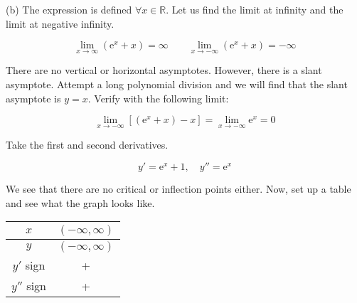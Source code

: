 \documentclass{article}
\begin{document}
\hfill

\noindent (b) The expression is defined $\forall x\in\mathbb{R}$. Let us find the limit at infinity and the limit at negative infinity.

\[\lim_{x\to\infty}\left(\mathrm{e}^x+x\right)=\infty\qquad\lim_{x\to-\infty}\left(\mathrm{e}^x+x\right)=-\infty\]

\hfill

\noindent There are no vertical or horizontal asymptotes. However, there is a slant asymptote. Attempt a long polynomial division and we will find that the slant asymptote is $y=x$. Verify with the following limit:

\[\lim_{x\to-\infty}\left[\left(\mathrm{e}^x+x\right)-x\right]=\lim_{x\to-\infty}\mathrm{e}^x=0\]

\hfill 

\noindent Take the first and second derivatives.

\[y'=\mathrm{e}^x+1,\quad y''=\mathrm{e}^x\]

\hfill 

\noindent We see that there are no critical or inflection points either. Now, set up a table and see what the graph looks like.

\begin{center}
    \large
    \begin{tabular}{ |c| c| } 
    \hline
        $x$ & $(-\infty, \infty)$\\
        \hline
        $y$ & $(-\infty, \infty)$\\
        \hline
        $y'$ sign & + \\
        \hline
        $y''$ sign & + \\
        \hline
    \end{tabular}
\end{center}

\hfill

\begin{center}
\end{center}
\end{document}
